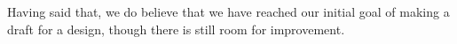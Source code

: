 Having said that, we do believe that we have reached our initial goal of making a draft for a design, though there is still room for improvement.
\newpage
